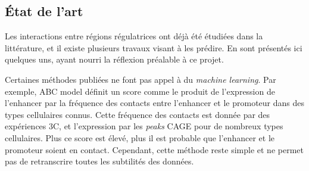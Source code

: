 \documentclass[french]{llncs}
\begin{document}
\subsection{État de l'art}

Les interactions entre régions régulatrices ont déjà été étudiées dans la littérature, et il existe plusieurs travaux visant à les prédire. En sont présentés ici quelques uns, ayant nourri la réflexion préalable à ce projet.

Certaines méthodes publiées ne font pas appel à du \textit{machine learning}. Par exemple, ABC model \cite{fulco_activity-by-contact_2019} définit un score comme le produit de l'expression de l'enhancer par la fréquence des contacts entre l'enhancer et le promoteur dans des types cellulaires connus. Cette fréquence des contacts est donnée par des expériences 3C, et l'expression par les \textit{peaks} CAGE pour de nombreux types cellulaires. Plus ce score est élevé, plus il est probable que l'enhancer et le promoteur soient en contact. Cependant, cette méthode reste simple et ne permet pas de retranscrire toutes les subtilités des données. 
\end{document}
